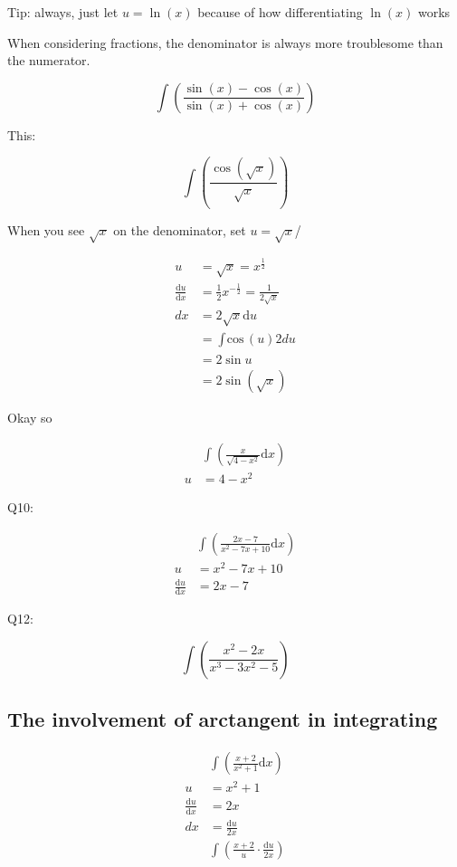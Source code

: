 \documentclass[12pt]{article}
\theoremstyle{plain}
\theoremstyle{remark}
\theoremstyle{definition}
\begin{document}
Tip: always, just let \(u = \ln(x)\) because of how differentiating
\(\ln(x)\) works

When considering fractions, the denominator is always more troublesome
than the numerator.

\[\int\left( \frac{\sin(x) - \cos(x)}{\sin(x) + \cos(x)} \right)\]

This:

\[\int\left( \frac{\cos\left( \sqrt{x} \right)}{\sqrt{x}} \right)\]

When you see \(\sqrt{x}\) on the denominator, set \(u = \sqrt{x}\)/

\begin{align*}
u &= \sqrt{x} = x^{\frac{1}{2}} \\
\frac{\text{d}u}{\text{d}x} &= \frac{1}{2}x^{- \frac{1}{2}} = \frac{1}{2\sqrt{x}} \\
dx &= 2\sqrt{x}\text{d}u \\
&= {\int_{}^{}\text{cos}}(u)2du \\
&= 2\sin u \\
&= 2\sin\left( \sqrt{x} \right)
\end{align*}


Okay so

\begin{align*}
&\int\left( \frac{x}{\sqrt{4 - x^{2}}}\text{d}x \right) \\
u &= 4 - x^{2}
\end{align*}


Q10:

\begin{align*}
&\int\left( \frac{2x - 7}{x^{2} - 7x + 10}\text{d}x \right) \\
u &= x^{2} - 7x + 10 \\
\frac{\text{d}u}{\text{d}x} &= 2x - 7
\end{align*}


Q12:

\[\int\left( \frac{x^{2} - 2x}{x^{3} - 3x^{2} - 5} \right)
\]


\subsection{The involvement of arctangent in
integrating}

\begin{align*}
&\int\left( \frac{x + 2}{x^{2} + 1}\text{d}x \right) \\
u &= x^{2} + 1 \\
\frac{\text{d}u}{\text{d}x} &= 2x \\
dx &= \frac{\text{d}u}{2x} \\
&\int\left( \frac{x + 2}{u} \cdot \frac{\text{d}u}{2x} \right)
\end{align*}
\end{document}
